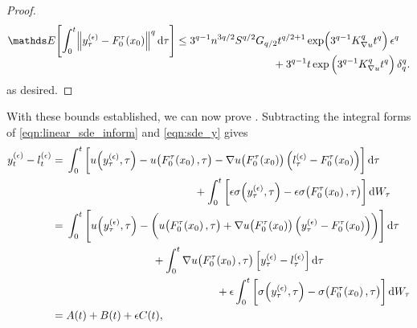 \begin{proof}
\begin{align*}
		\avg{\int_0^t{\norm{y_\tau^{(\epsilon)} - F_0^\tau\!\left(x_0\right)}^q\dif\tau}} \leq \begin{multlined}[t]
			                                                                                       3^{q-1}n^{3q/2}S^{q/2} G_{q/2} t^{q/2 + 1}\exp\!\left(3^{q-1} K_{\nabla u}^q t^q\right)\epsilon^q  \\
			                                                                                       + 3^{q-1}t\exp\left(3^{q-1} K_{\nabla u}^q t^q\right)\delta_q^q.
		                                                                                       \end{multlined}
	\end{align*}
	as desired.
\end{proof}

With these bounds established, we can now prove .
Subtracting the integral forms of \eqref{eqn:linear_sde_inform} and \eqref{eqn:sde_y} gives
\begin{align*}
	y_t^{(\epsilon)} - l_t^{(\epsilon)} & = \begin{multlined}[t]
		                                        \int_0^t{\left[u\!\left(y_\tau^{(\epsilon)}, \tau\right) - u\!\left(F_0^\tau\!\left(x_0\right), \tau\right) - \nabla u\!\left(F_0^\tau\!\left(x_0\right)\right)\left(l_\tau^{(\epsilon)} - F_0^\tau\!\left(x_0\right)\right)\right]\dif\tau} \\
		                                        + \int_0^t{\left[\epsilon\sigma\!\left(y_\tau^{(\epsilon)}, \tau\right) - \epsilon\sigma\!\left(F_0^{\tau}\!\left(x_0\right), \tau\right)\right]\dif W_\tau}
	                                        \end{multlined}              \\
	                                    & = \begin{multlined}[t]
		                                        \int_0^t{\left[u\!\left(y_\tau^{(\epsilon)}, \tau\right) - \left(u\!\left(F_0^\tau\!\left(x_0\right), \tau\right) + \nabla u\!\left(F_0^\tau\!\left(x_0\right)\right)\left(y_\tau^{(\epsilon)} - F_0^\tau\!\left(x_0\right)\right)\right)\right]\dif\tau} \\
		                                        + \int_0^t{\nabla u\!\left(F_0^\tau\!\left(x_0\right), \tau\right)\left[y_\tau^{(\epsilon)} - l_\tau^{(\epsilon)}\right]\dif \tau} \\
		                                        + \epsilon\int_0^t{ \left[\sigma\!\left(y_\tau^{(\epsilon)}, \tau\right) - \sigma\!\left(F_0^{\tau}\!\left(x_0\right), \tau\right)\right]\dif W_\tau}
	                                        \end{multlined} \\
	                                    & = A(t) + B(t) + \epsilon C(t),
\end{align*}
